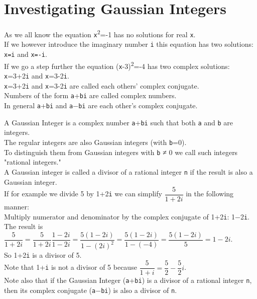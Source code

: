 \section[Problem \#153: Investigating Gaussian Integers]{Investigating Gaussian Integers}
\label{sec:problem_153}

As we all know the equation \texttt{x}\textsuperscript{2}=-1 has no
solutions for real \texttt{x}.\\
If we however introduce the imaginary number \texttt{i} this equation
has two solutions: \texttt{x=i} and \texttt{x=-i}.\\
If we go a step further the equation
(\texttt{x}-3)\textsuperscript{2}=-4 has two complex solutions:
\texttt{x}=3+2\texttt{i} and \texttt{x}=3-2\texttt{i}.\\
\texttt{x}=3+2\texttt{i} and \texttt{x}=3-2\texttt{i} are called each
others' complex conjugate.\\
Numbers of the form \texttt{a}+\texttt{bi} are called complex numbers.\\
In general \texttt{a}+\texttt{bi} and \texttt{a}−\texttt{bi} are each
other's complex conjugate.

A Gaussian Integer is a complex number \texttt{a}+\texttt{bi} such that
both \texttt{a} and \texttt{b} are integers.\\
The regular integers are also Gaussian integers (with \texttt{b}=0).\\
To distinguish them from Gaussian integers with \texttt{b} ≠ 0 we call
such integers "rational integers."\\
A Gaussian integer is called a divisor of a rational integer \texttt{n}
if the result is also a Gaussian integer.\\
If for example we divide 5 by 1+2\texttt{i} we can simplify
$\dfrac{5}{1 + 2i}$ in the following manner:\\
Multiply numerator and denominator by the complex conjugate of
1+2\texttt{i}: 1−2\texttt{i}.\\
The result is $\dfrac{5}{1 + 2i} = \dfrac{5}{1 + 2i}\dfrac{1 - 2i}{1 - 2i} = \dfrac{5(1 - 2i)}{1 - (2i)^2} = \dfrac{5(1 - 2i)}{1 - (-4)} = \dfrac{5(1 - 2i)}{5} = 1 - 2i$.\\
So 1+2\texttt{i} is a divisor of 5.\\
Note that 1+\texttt{i} is not a divisor of 5 because
$\dfrac{5}{1 + i} = \dfrac{5}{2} - \dfrac{5}{2}i$.\\
Note also that if the Gaussian Integer (\texttt{a}+\texttt{bi}) is a
divisor of a rational integer \texttt{n}, then its complex conjugate
(\texttt{a}−\texttt{bi}) is also a divisor of \texttt{n}.

